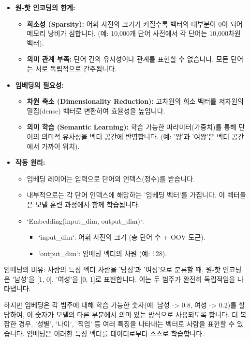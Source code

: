 \documentclass[11pt,a4paper]{article}
\begin{document}
\begin{itemize}
    \item \textbf{원-핫 인코딩의 한계:}
        \begin{itemize}
            \item \textbf{희소성 (Sparsity):} 어휘 사전의 크기가 커질수록 벡터의 대부분이 0이 되어 메모리 낭비가 심합니다. (예: 10,000개 단어 사전에서 각 단어는 10,000차원 벡터).
            \item \textbf{의미 관계 부족:} 단어 간의 유사성이나 관계를 표현할 수 없습니다. 모든 단어는 서로 독립적으로 간주됩니다.
        \end{itemize}
    \item \textbf{임베딩의 필요성:}
        \begin{itemize}
            \item \textbf{차원 축소 (Dimensionality Reduction):} 고차원의 희소 벡터를 저차원의 밀집(dense) 벡터로 변환하여 효율성을 높입니다.
            \item \textbf{의미 학습 (Semantic Learning):} 학습 가능한 파라미터(가중치)를 통해 단어의 의미적 유사성을 벡터 공간에 반영합니다. (예: '왕'과 '여왕'은 벡터 공간에서 가까이 위치).
        \end{itemize}
    \item \textbf{작동 원리:}
        \begin{itemize}
            \item 임베딩 레이어는 입력으로 단어의 인덱스(정수)를 받습니다.
            \item 내부적으로는 각 단어 인덱스에 해당하는 '임베딩 벡터'를 가집니다. 이 벡터들은 모델 훈련 과정에서 함께 학습됩니다.
            \item `Embedding(input_dim, output_dim)`:
                \begin{itemize}
                    \item `input_dim`: 어휘 사전의 크기 (총 단어 수 + OOV 토큰).
                    \item `output_dim`: 임베딩 벡터의 차원 (예: 128).
                \end{itemize}
        \end{itemize}
\end{itemize}

\begin{examplebox}{임베딩의 비유: 사람의 특징 벡터}
사람을 '남성'과 '여성'으로 분류할 때, 원-핫 인코딩은 '남성'을 [1, 0], '여성'을 [0, 1]로 표현합니다. 이는 두 범주가 완전히 독립적임을 나타냅니다.

하지만 임베딩은 각 범주에 대해 학습 가능한 숫자(예: 남성 -> 0.8, 여성 -> 0.2)를 할당하여, 이 숫자가 모델의 다른 부분에서 의미 있는 방식으로 사용되도록 합니다. 더 복잡한 경우, '성별', '나이', '직업' 등 여러 특징을 나타내는 벡터로 사람을 표현할 수 있습니다. 임베딩은 이러한 특징 벡터를 데이터로부터 스스로 학습합니다.
\end{examplebox}
\end{document}
